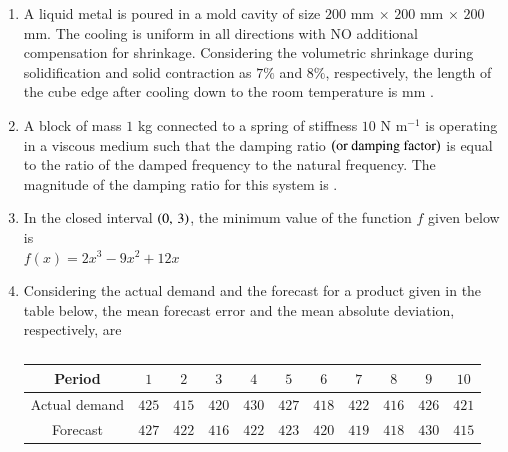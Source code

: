 \documentclass[journal]{IEEEtran}
\begin{document}
\begin{enumerate}[leftmargin=0pt]
\item
A liquid metal is poured in a mold cavity of size $200$ mm $\times$ $200$ mm $\times$ $200$ mm. The cooling is uniform in all directions with NO additional compensation for shrinkage. Considering the volumetric shrinkage during solidification and solid contraction as $7\%$ and $8\%$, respectively, the length of the cube edge after cooling down to the room temperature is \underline{\hspace{2cm}} mm .

\hfill{}

\item
A block of mass $1$ kg connected to a spring of stiffness $10$ N m$^{-1}$ is operating in a viscous medium such that the damping ratio $\left(\text{or damping factor}\right)$ is equal to the ratio of the damped frequency to the natural frequency. The magnitude of the damping ratio for this system is \underline{\hspace{2cm}} .

\hfill{}

\item
In the closed interval $\left(0,\, 3\right)$, the minimum value of the function $f$ given below is\\
$f(x) = 2x^3 - 9x^2 + 12x$\\
\begin{enumerate}
\end{enumerate}
\hfill{}

\item
Considering the actual demand and the forecast for a product given in the table below, the mean forecast error and the mean absolute deviation, respectively, are

\begin{table}[ht]
\centering
\caption*{}
\label{tab:forecast}
\begin{tabular}{|c|c|c|c|c|c|c|c|c|c|c|}
\hline
Period & $1$ & $2$ & $3$ & $4$ & $5$ & $6$ & $7$ & $8$ & $9$ & $10$ \\
\hline
Actual demand & $425$ & $415$ & $420$ & $430$ & $427$ & $418$ & $422$ & $416$ & $426$ & $421$ \\
\hline
Forecast      & $427$ & $422$ & $416$ & $422$ & $423$ & $420$ & $419$ & $418$ & $430$ & $415$ \\
\hline
\end{tabular}
\end{table}


\end{enumerate}
\end{document}
